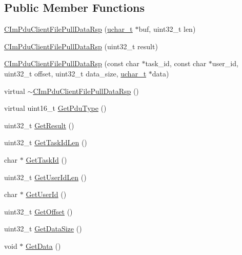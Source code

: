 \subsection*{Public Member Functions}
\begin{DoxyCompactItemize}
\item 
\hyperlink{class_c_im_pdu_client_file_pull_data_rsp_ad4d44f965e3274362e6395a07c260dcf}{C\+Im\+Pdu\+Client\+File\+Pull\+Data\+Rsp} (\hyperlink{base_2ostype_8h_a124ea0f8f4a23a0a286b5582137f0b8d}{uchar\+\_\+t} $\ast$buf, uint32\+\_\+t len)
\item 
\hyperlink{class_c_im_pdu_client_file_pull_data_rsp_a28f177be52fdf9768c4c8582f146b20d}{C\+Im\+Pdu\+Client\+File\+Pull\+Data\+Rsp} (uint32\+\_\+t result)
\item 
\hyperlink{class_c_im_pdu_client_file_pull_data_rsp_a918076220b67630a6764005bd067b37f}{C\+Im\+Pdu\+Client\+File\+Pull\+Data\+Rsp} (const char $\ast$task\+\_\+id, const char $\ast$user\+\_\+id, uint32\+\_\+t offset, uint32\+\_\+t data\+\_\+size, \hyperlink{base_2ostype_8h_a124ea0f8f4a23a0a286b5582137f0b8d}{uchar\+\_\+t} $\ast$data)
\item 
virtual \hyperlink{class_c_im_pdu_client_file_pull_data_rsp_ac76a38c2c9d01dec1ed70184fc946cec}{$\sim$\+C\+Im\+Pdu\+Client\+File\+Pull\+Data\+Rsp} ()
\item 
virtual uint16\+\_\+t \hyperlink{class_c_im_pdu_client_file_pull_data_rsp_adc1023a8a12442cf0b756780ff2659da}{Get\+Pdu\+Type} ()
\item 
uint32\+\_\+t \hyperlink{class_c_im_pdu_client_file_pull_data_rsp_aa43db6eacb9bba0f8ec6a2f8fb4b0dfc}{Get\+Result} ()
\item 
uint32\+\_\+t \hyperlink{class_c_im_pdu_client_file_pull_data_rsp_a783612b8a3a1679687f47cbb79715acd}{Get\+Task\+Id\+Len} ()
\item 
char $\ast$ \hyperlink{class_c_im_pdu_client_file_pull_data_rsp_a516d753b3e0c0e89dfc782805b399f68}{Get\+Task\+Id} ()
\item 
uint32\+\_\+t \hyperlink{class_c_im_pdu_client_file_pull_data_rsp_accff82c773aad69bf22d7f6724ffeab5}{Get\+User\+Id\+Len} ()
\item 
char $\ast$ \hyperlink{class_c_im_pdu_client_file_pull_data_rsp_aba8b04c3b149bcecf69ec50e357408b4}{Get\+User\+Id} ()
\item 
uint32\+\_\+t \hyperlink{class_c_im_pdu_client_file_pull_data_rsp_a84f33633c5c4b68daf8e006ee1a430e8}{Get\+Offset} ()
\item 
uint32\+\_\+t \hyperlink{class_c_im_pdu_client_file_pull_data_rsp_a2c4e87ddf4a9d6d6d69ccc4915f7d6e0}{Get\+Data\+Size} ()
\item 
void $\ast$ \hyperlink{class_c_im_pdu_client_file_pull_data_rsp_a37056be5dfe2b874d78bc54a5c2be86a}{Get\+Data} ()
\end{DoxyCompactItemize}
